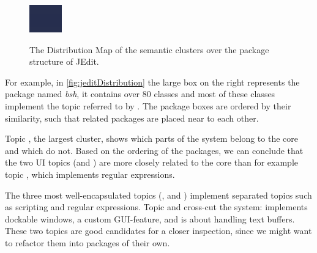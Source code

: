 \documentclass[10pt]{book}
\begin{document}
\begin{figure}[h]
  \centering
  \includegraphics[width=\linewidth]{jeditDistribution}\\
  \caption{The Distribution Map of the semantic clusters over the package structure of JEdit.}\label{fig:jeditDistribution}
\end{figure}


For example, in \autoref{fig:jeditDistribution} the large box on the right represents the package named \emph{bsh}, it contains over 80 classes and most of these classes implement the topic referred to by \blue. The package boxes are ordered by their similarity, such that related packages are placed near to each other.

Topic \red, the largest cluster, shows which parts of the system belong to the core and which do not. Based on the ordering of the packages, we can conclude that the two UI topics (\eg \green and \yellow) are more closely related to the core than for example topic \cyan, which implements regular expressions.

The three most well-encapsulated topics (\eg \orange, \blue and \cyan) implement separated topics such as scripting and regular expressions. Topic \yellow and \pink cross-cut the system: \yellow implements dockable windows, a custom GUI-feature, and \pink is about handling text buffers. These two topics are good candidates for a closer inspection, since we might want to refactor them into packages of their own.
\end{document}
